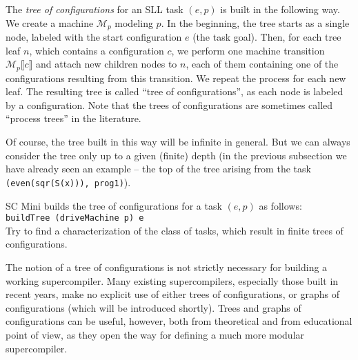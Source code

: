 The \emph{tree of configurations} for an SLL task $(e, p)$ is built in the following way.
We create a machine $\mathcal{M}_p$ modeling $p$.
In the beginning, the tree starts as a single node, labeled with the start configuration $e$ (the task goal).
Then, for each tree leaf $n$, which contains a configuration $c$, 
we perform one machine transition $\mathcal{M}_p \llbracket c \rrbracket$ and attach new children nodes to $n$,
each of them containing one of the configurations resulting from this transition.
We repeat the process for each new leaf. 
The resulting tree is called ``tree of configurations'', as each node is labeled by a configuration.
Note that the trees of configurations are sometimes called ``process trees'' in the literature.

Of course, the tree built in this way will be infinite in general.
But we can always consider the tree only up to a given (finite) depth
(in the previous subsection we have already seen an example -- the top of the
tree arising from the task \texttt{(even(sqr(S(x))), prog1)}).



\begin{exercise}
SC Mini builds the tree of configurations for a task $(e, p)$ as follows:
\\ \texttt{buildTree (driveMachine p) e}
\\
Try to find a characterization of the class of tasks, which result in finite trees of configurations.
\end{exercise}

The notion of a tree of configurations is not strictly necessary for building a working 
supercompiler.
Many existing supercompilers, especially those built in recent years,
make no explicit use of either trees of configurations, or graphs of configurations 
(which will be introduced shortly).
Trees and graphs of configurations can be useful, however, 
both from theoretical and from educational point of view,
as they open the way for defining a much more modular supercompiler.

